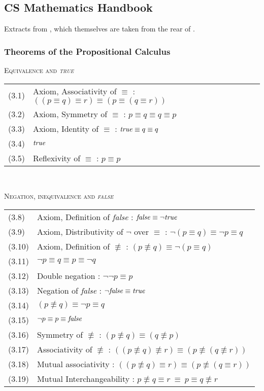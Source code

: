 \subsection{CS Mathematics Handbook}

Extracts from \cite{MathHbk:05}, which themselves
are taken from the rear of \cite{gries.93}.


\subsubsection{Theorems of the Propositional Calculus}

\textsc{Equivalence and \textit{true}\\}

\begin{tabular}{ll}
(3.1) & Axiom, Associativity of $\equiv$ : $((p\equiv q)\equiv r) \equiv (p\equiv (q\equiv r))$\\
(3.2) & Axiom, Symmetry of  $\equiv$ : $p\equiv q\equiv q \equiv p$\\
(3.3) & Axiom, Identity of  $\equiv$ : $\mbox{\textit{true}} \equiv q\equiv q $\\
(3.4) & $\mbox{\textit{true}}$\\
(3.5) & Reflexivity of  $\equiv$ : $p\equiv p $\\
\end{tabular}

\ \par

\textsc{Negation, inequivalence and \textit{false}\\}

\begin{tabular}{ll}
(3.8) & Axiom, Definition of \textit{false} : $\mbox{\textit{false}} \equiv \neg \mbox{\textit{true}}$\\
(3.9) & Axiom, Distributivity of  $\neg$ over $\equiv$ : $\neg(p\equiv q) \equiv \neg p \equiv q$\\
(3.10) & Axiom, Definition of $\not \equiv$ : $(p\not\equiv q) \equiv \neg(p\equiv q)$\\
(3.11) & $\neg p\equiv q \equiv p \equiv \neg q$\\
(3.12) &  Double negation : $\neg \neg p \equiv p$\\
(3.13) &  Negation of \textit{false} : $\neg \mbox{\textit{false}} \equiv \mbox{\textit{true}}$\\
(3.14) &  $(p\not \equiv q) \equiv \neg p \equiv q$\\
(3.15) &  $\neg p \equiv p \equiv \mbox{\textit{false}}$\\
(3.16) &  Symmetry of $\not \equiv$ : $(p\not \equiv q) \equiv (q\not\equiv p)$\\
(3.17) &  Associativity of $\not\equiv$ : $((p\not\equiv q)\not\equiv r) \equiv (p\not\equiv (q\not\equiv r))$\\
(3.18) &  Mutual associativity : $((p\not \equiv q)\equiv r) \equiv (p\not\equiv (q\equiv r))$\\
(3.19) &  Mutual Interchangeability : $p\not \equiv q \equiv r\ \equiv\ p\equiv q\not \equiv r$\\
\end{tabular}


